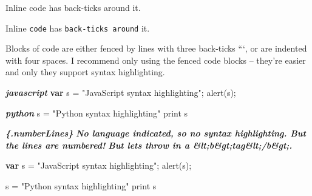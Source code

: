 \documentclass[
]{article}
\newenvironment{Shaded}{}{}
\newcommand{\BuiltInTok}[1]{\textcolor[rgb]{0.00,0.50,0.00}{#1}}
\newcommand{\FunctionTok}[1]{\textcolor[rgb]{0.02,0.16,0.49}{#1}}
\newcommand{\InformationTok}[1]{\textcolor[rgb]{0.38,0.63,0.69}{\textbf{\textit{#1}}}}
\newcommand{\KeywordTok}[1]{\textcolor[rgb]{0.00,0.44,0.13}{\textbf{#1}}}
\newcommand{\NormalTok}[1]{#1}
\newcommand{\OperatorTok}[1]{\textcolor[rgb]{0.40,0.40,0.40}{#1}}
\newcommand{\StringTok}[1]{\textcolor[rgb]{0.25,0.44,0.63}{#1}}
\begin{document}
\begin{Shaded}
\begin{Highlighting}[]
\NormalTok{Inline \textasciigrave{}code\textasciigrave{} has \textasciigrave{}back{-}ticks around\textasciigrave{} it.}
\end{Highlighting}
\end{Shaded}

Inline \texttt{code} has \texttt{back-ticks\ around} it.

Blocks of code are either fenced by lines with three back-ticks ```, or
are indented with four spaces. I recommend only using the fenced code
blocks -- they're easier and only they support syntax highlighting.

\begin{Shaded}
\begin{Highlighting}[]
\InformationTok{\textasciigrave{}\textasciigrave{}\textasciigrave{}javascript}
\KeywordTok{var}\NormalTok{ s }\OperatorTok{=} \StringTok{"JavaScript syntax highlighting"}\OperatorTok{;}
\FunctionTok{alert}\NormalTok{(s)}\OperatorTok{;}
\InformationTok{\textasciigrave{}\textasciigrave{}\textasciigrave{}}

\InformationTok{\textasciigrave{}\textasciigrave{}\textasciigrave{}python}
\NormalTok{s }\OperatorTok{=} \StringTok{"Python syntax highlighting"}
\BuiltInTok{print}\NormalTok{ s}
\InformationTok{\textasciigrave{}\textasciigrave{}\textasciigrave{}}

\InformationTok{\textasciigrave{}\textasciigrave{}\textasciigrave{}\{.numberLines\}}
\InformationTok{No language indicated, so no syntax highlighting. But the lines are numbered!}
\InformationTok{But let\textquotesingle{}s throw in a \&lt;b\&gt;tag\&lt;/b\&gt;.}
\InformationTok{\textasciigrave{}\textasciigrave{}\textasciigrave{}}
\end{Highlighting}
\end{Shaded}

\begin{Shaded}
\begin{Highlighting}[]
\KeywordTok{var}\NormalTok{ s }\OperatorTok{=} \StringTok{"JavaScript syntax highlighting"}\OperatorTok{;}
\FunctionTok{alert}\NormalTok{(s)}\OperatorTok{;}
\end{Highlighting}
\end{Shaded}

\begin{Shaded}
\begin{Highlighting}[]
\NormalTok{s }\OperatorTok{=} \StringTok{"Python syntax highlighting"}
\BuiltInTok{print}\NormalTok{ s}
\end{Highlighting}
\end{Shaded}
\end{document}
